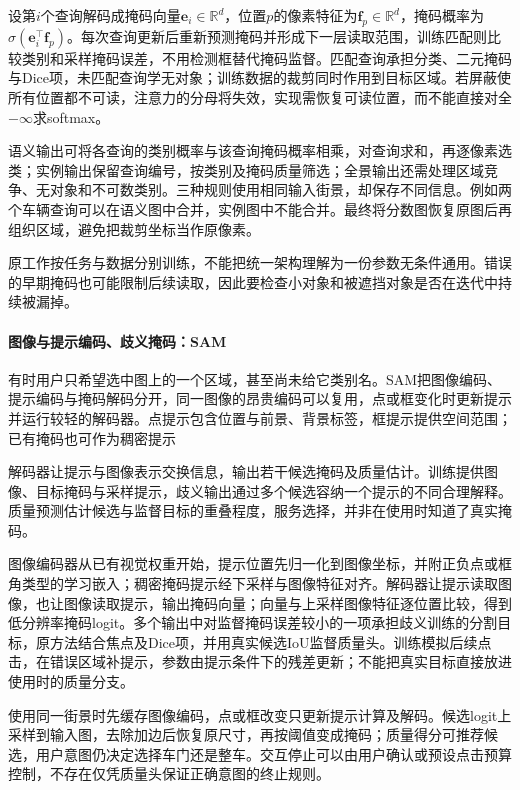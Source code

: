 设第$i$个查询解码成掩码向量$\bm{e}_i\in\mathbb{R}^d$，位置$p$的像素特征为$\bm{f}_p\in\mathbb{R}^d$，掩码概率为$\sigma(\bm{e}_i^\top\bm{f}_p)$。每次查询更新后重新预测掩码并形成下一层读取范围，训练匹配则比较类别和采样掩码误差，不用检测框替代掩码监督。匹配查询承担分类、二元掩码与Dice项，未匹配查询学无对象；训练数据的裁剪同时作用到目标区域。若屏蔽使所有位置都不可读，注意力的分母将失效，实现需恢复可读位置，而不能直接对全$-\infty$求softmax。

语义输出可将各查询的类别概率与该查询掩码概率相乘，对查询求和，再逐像素选类；实例输出保留查询编号，按类别及掩码质量筛选；全景输出还需处理区域竞争、无对象和不可数类别。三种规则使用相同输入街景，却保存不同信息。例如两个车辆查询可以在语义图中合并，实例图中不能合并。最终将分数图恢复原图后再组织区域，避免把裁剪坐标当作原像素。

原工作按任务与数据分别训练，不能把统一架构理解为一份参数无条件通用。错误的早期掩码也可能限制后续读取，因此要检查小对象和被遮挡对象是否在迭代中持续被漏掉。

\paragraph{图像与提示编码、歧义掩码：SAM}
\label{sec:vision-recognition-sam}

有时用户只希望选中图上的一个区域，甚至尚未给它类别名。SAM把图像编码、提示编码与掩码解码分开，同一图像的昂贵编码可以复用，点或框变化时更新提示并运行较轻的解码器。点提示包含位置与前景、背景标签，框提示提供空间范围；已有掩码也可作为稠密提示

解码器让提示与图像表示交换信息，输出若干候选掩码及质量估计。训练提供图像、目标掩码与采样提示，歧义输出通过多个候选容纳一个提示的不同合理解释。质量预测估计候选与监督目标的重叠程度，服务选择，并非在使用时知道了真实掩码。

图像编码器从已有视觉权重开始，提示位置先归一化到图像坐标，并附正负点或框角类型的学习嵌入；稠密掩码提示经下采样与图像特征对齐。解码器让提示读取图像，也让图像读取提示，输出掩码向量；向量与上采样图像特征逐位置比较，得到低分辨率掩码logit。多个输出中对监督掩码误差较小的一项承担歧义训练的分割目标，原方法结合焦点及Dice项，并用真实候选IoU监督质量头。训练模拟后续点击，在错误区域补提示，参数由提示条件下的残差更新；不能把真实目标直接放进使用时的质量分支。

使用同一街景时先缓存图像编码，点或框改变只更新提示计算及解码。候选logit上采样到输入图，去除加边后恢复原尺寸，再按阈值变成掩码；质量得分可推荐候选，用户意图仍决定选择车门还是整车。交互停止可以由用户确认或预设点击预算控制，不存在仅凭质量头保证正确意图的终止规则。

